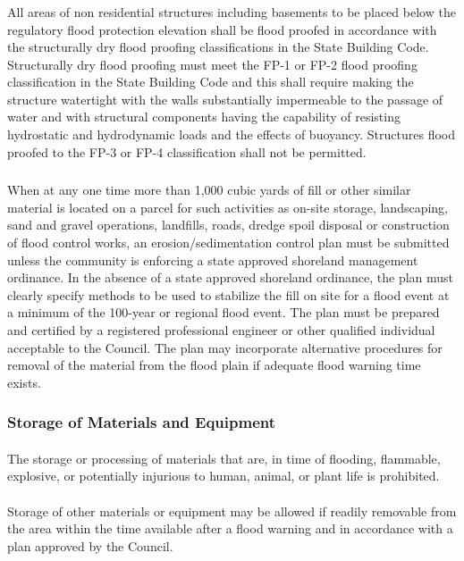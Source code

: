 \subsubsection{}
All areas of non residential structures including basements to be placed below the regulatory flood protection elevation shall be flood proofed in accordance with the structurally dry flood proofing classifications in the State Building Code. Structurally dry flood proofing must meet the FP-1 or FP-2 flood proofing classification in the State Building Code and this shall require making the structure watertight with the walls substantially impermeable to the passage of water and with structural components having the capability of resisting hydrostatic and hydrodynamic loads and the effects of buoyancy. Structures flood proofed to the FP-3 or FP-4 classification shall not be permitted.
\subsubsection{}
When at any one time more than 1,000 cubic yards of fill or other similar material is located on a parcel for such activities as on-site storage, landscaping, sand and gravel operations, landfills, roads, dredge spoil disposal or construction of flood control works, an erosion/sedimentation control plan must be submitted unless the community is enforcing a state approved shoreland management ordinance. In the absence of a state approved shoreland ordinance, the plan must clearly specify methods to be used to stabilize the fill on site for a flood event at a minimum of the 100-year or regional flood event. The plan must be prepared and certified by a registered professional engineer or other qualified individual acceptable to the Council. The plan may incorporate alternative procedures for removal of the material from the flood plain if adequate flood warning time exists.
\subsubsection{Storage of Materials and Equipment}
\paragraph{}
The storage or processing of materials that are, in time of flooding, flammable, explosive, or potentially injurious to human, animal, or plant life is prohibited.
\paragraph{}
Storage of other materials or equipment may be allowed if readily removable from the area within the time available after a flood warning and in accordance with a plan approved by the Council.
